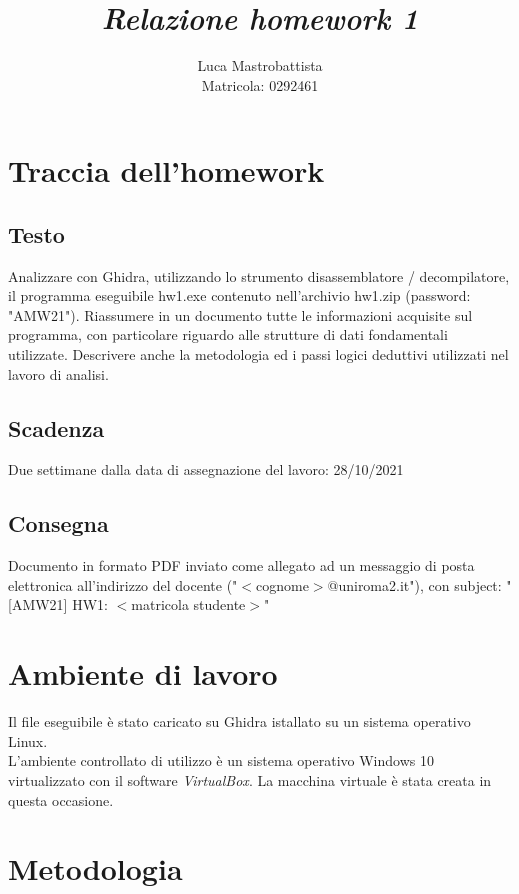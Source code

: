 \documentclass[a4paper, 12pt]{article}
\begin{document}
\sloppy
  
\title{
  \textbf{
    \emph{Relazione homework 1}
  }
}  
\author{Luca Mastrobattista\\ Matricola: 0292461}
\date{}
\maketitle

\tableofcontents

\newpage
\section{Traccia dell'homework}
\subsection{Testo}
Analizzare con Ghidra, utilizzando lo strumento 
disassemblatore / decompilatore, il programma eseguibile
hw1.exe contenuto nell'archivio hw1.zip (password: "AMW21").
Riassumere in un documento tutte le informazioni acquisite
sul programma, con particolare riguardo alle strutture di
dati fondamentali utilizzate.
Descrivere anche la metodologia ed i passi logici deduttivi
utilizzati nel lavoro di analisi.
\subsection{Scadenza}
Due settimane dalla data di assegnazione del lavoro: 28/10/2021
\subsection{Consegna}
Documento in formato PDF inviato come allegato ad
un messaggio di posta elettronica all'indirizzo del docente
("$<$cognome$>$@uniroma2.it"), con subject:
"[AMW21] HW1: $<$matricola studente$>$"

\newpage
\section{Ambiente di lavoro}
Il file eseguibile è stato caricato su Ghidra istallato su un sistema operativo Linux. \\
L'ambiente controllato di utilizzo è un sistema operativo Windows 10 virtualizzato con il software \emph{VirtualBox}. La macchina virtuale è stata creata in questa occasione.

\newpage
\section{Metodologia}
\end{document}
